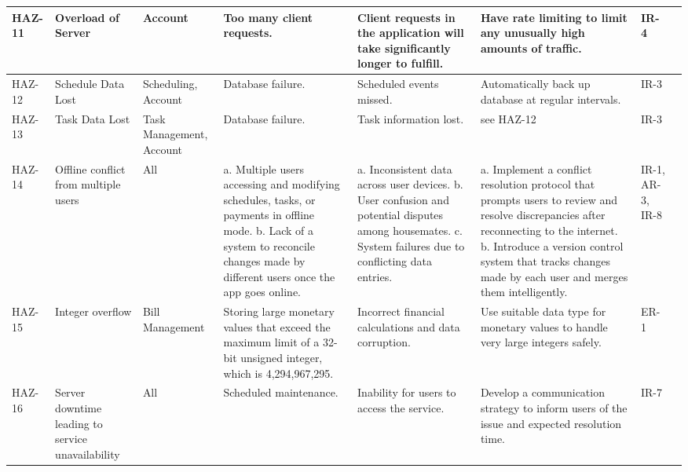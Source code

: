 \documentclass{article}
\begin{document}
\begin{center}
\begin{longtable}{|p{1.5cm}|p{2cm}|p{2cm}|p{3cm}|p{3.5cm}|p{4cm}|p{1cm}|p{1cm}|}
HAZ-11 & Overload of Server & Account &  Too many client requests. & Client requests in the application will take significantly longer to fulfill. & Have rate limiting to limit any unusually high amounts of traffic.  & IR-4 \\ \hline
HAZ-12 & Schedule Data Lost & Scheduling, Account &  Database failure.  & Scheduled events missed. & Automatically back up database at regular intervals. & IR-3 \\ \hline
HAZ-13 & Task Data Lost &  Task Management, Account &  Database failure.  & Task information lost.  & see HAZ-12 & IR-3\\ \hline
HAZ-14 & Offline conflict from multiple users &  All &  a. Multiple users accessing and modifying schedules, tasks, or payments in offline mode. \newline
b. Lack of a system to reconcile changes made by different users once the app goes online.  & a. Inconsistent data across user devices. \newline
b. User confusion and potential disputes among housemates. \newline
c. System failures due to conflicting data entries.  & a. Implement a conflict resolution protocol that prompts users to review and resolve discrepancies after reconnecting to the internet. \newline
b. Introduce a version control system that tracks changes made by each user and merges them intelligently. & IR-1, AR-3, IR-8\\ \hline
HAZ-15 & Integer overflow &  Bill Management &  Storing large monetary values that exceed the maximum limit of a 32-bit unsigned integer, which is 4,294,967,295.  & Incorrect financial calculations and data corruption.  & Use suitable data type for monetary values to handle very large integers safely. & ER-1\\ \hline
HAZ-16 & Server downtime leading to service unavailability &  All &  Scheduled maintenance. & Inability for users to access the service.  & Develop a communication strategy to inform users of the issue and expected resolution time. & IR-7\\ \hline

\end{longtable}
\end{center}




\end{document}

